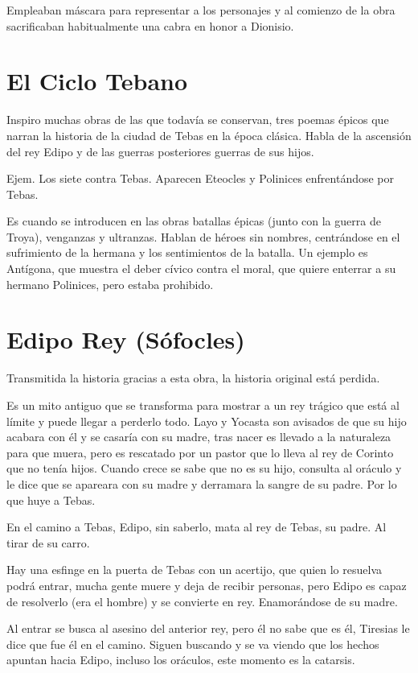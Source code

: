 Empleaban máscara para representar a los personajes y al comienzo de la obra sacrificaban habitualmente una cabra en honor a Dionisio.

\section{El Ciclo Tebano}
Inspiro muchas obras de las que todavía se conservan, tres poemas épicos que narran la historia de la ciudad de Tebas en la época clásica. Habla de la ascensión del rey Edipo y de las guerras posteriores guerras de sus hijos.

Ejem. Los siete contra Tebas. Aparecen Eteocles y Polinices enfrentándose por Tebas.

Es cuando se introducen en las obras batallas épicas (junto con la guerra de Troya), venganzas y ultranzas. Hablan de héroes sin nombres, centrándose en el sufrimiento de la hermana y los sentimientos de la batalla. Un ejemplo es Antígona, que muestra el deber cívico contra el moral, que quiere enterrar a su hermano Polinices, pero estaba prohibido.

\section{Edipo Rey (Sófocles)}
Transmitida la historia gracias a esta obra, la historia original está perdida.

Es un mito antiguo que se transforma para mostrar a un rey trágico que está al límite y puede llegar a perderlo todo. Layo y Yocasta son avisados de que su hijo acabara con él y se casaría con su madre, tras nacer es llevado a la naturaleza para que muera, pero es rescatado por un pastor que lo lleva al rey de Corinto que no tenía hijos. Cuando crece se sabe que no es su hijo, consulta al oráculo y le dice que se apareara con su madre y derramara la sangre de su padre. Por lo que huye a Tebas.

En el camino a Tebas, Edipo, sin saberlo, mata al rey de Tebas, su padre. Al tirar de su carro.

Hay una esfinge en la puerta de Tebas con un acertijo, que quien lo resuelva podrá entrar, mucha gente muere y deja de recibir personas, pero Edipo es capaz de resolverlo (era el hombre) y se convierte en rey. Enamorándose de su madre.

Al entrar se busca al asesino del anterior rey, pero él no sabe que es él, Tiresias le dice que fue él en el camino. Siguen buscando y se va viendo que los hechos apuntan hacia Edipo, incluso los oráculos, este momento es la catarsis.

